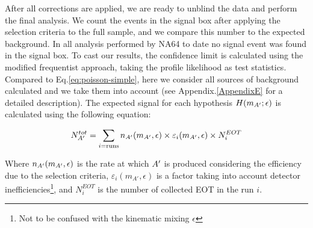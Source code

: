 After all corrections are applied, we are ready to unblind the data and perform the final analysis. We count the events in the signal box after applying the selection criteria to the full sample, and we compare this number to the expected background. In all analysis performed by NA64 to date \cite{Banerjee:2020fue,Banerjee:2019hmi,NA64:2019imj,na64-prd,Banerjee:2018vgk,Banerjee:2016tad} no signal event was found in the signal box. To cast our results, the confidence limit is calculated using the modified frequentist approach, taking the profile likelihood as test statistics\cite{JUNK1999435,Read_2002,Cowan:2010js}. Compared to Eq.\ref{eq:poisson-simple}, here we consider all sources of background calculated and we take them into account (see Appendix.\ref{AppendixE} for a detailed description). The expected signal for each hypothesis $H(m_{A'};\epsilon)$ is calculated using the following equation:

\begin{equation}
  \label{eq:dm-expected-signal}
  N^{tot}_{A'} = \sum_{i=\rm{runs}} n_{A'}(m_{A'},\epsilon) \times \varepsilon_i(m_{A'},\epsilon) \times N^{EOT}_i
\end{equation}

Where $n_{A'}(m_{A'},\epsilon)$ is the rate at which $A'$ is produced considering the efficiency due to the selection criteria, $\varepsilon_i(m_{A'},\epsilon)$ is a factor taking into account detector inefficiencies\footnote{Not to be confused with the kinematic mixing $\epsilon$}, and $N^{EOT}_i$ is the number of collected EOT in the run $i$.

